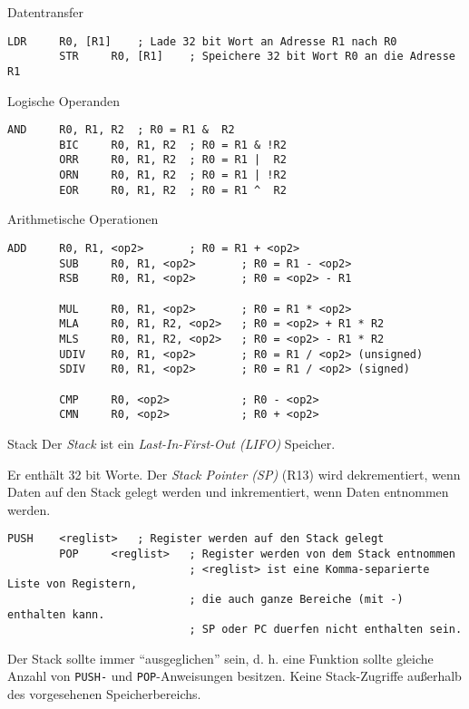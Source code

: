 \begin{defi}{Datentransfer}
    \begin{lstlisting}[language={[x86masm]Assembler}]
        LDR     R0, [R1]    ; Lade 32 bit Wort an Adresse R1 nach R0
        STR     R0, [R1]    ; Speichere 32 bit Wort R0 an die Adresse R1  
    \end{lstlisting}
\end{defi}

\begin{defi}{Logische Operanden}
    \begin{lstlisting}[language={[x86masm]Assembler}]
        AND     R0, R1, R2  ; R0 = R1 &  R2
        BIC     R0, R1, R2  ; R0 = R1 & !R2
        ORR     R0, R1, R2  ; R0 = R1 |  R2
        ORN     R0, R1, R2  ; R0 = R1 | !R2
        EOR     R0, R1, R2  ; R0 = R1 ^  R2
    \end{lstlisting}
\end{defi}

\begin{defi}{Arithmetische Operationen}
    \begin{lstlisting}[language={[x86masm]Assembler}]
        ADD     R0, R1, <op2>       ; R0 = R1 + <op2>
        SUB     R0, R1, <op2>       ; R0 = R1 - <op2>
        RSB     R0, R1, <op2>       ; R0 = <op2> - R1

        MUL     R0, R1, <op2>       ; R0 = R1 * <op2>
        MLA     R0, R1, R2, <op2>   ; R0 = <op2> + R1 * R2
        MLS     R0, R1, R2, <op2>   ; R0 = <op2> - R1 * R2
        UDIV    R0, R1, <op2>       ; R0 = R1 / <op2> (unsigned)
        SDIV    R0, R1, <op2>       ; R0 = R1 / <op2> (signed)

        CMP     R0, <op2>           ; R0 - <op2>
        CMN     R0, <op2>           ; R0 + <op2>
    \end{lstlisting}
\end{defi}

\begin{defi}{Stack}
    Der \emph{Stack} ist ein \emph{Last-In-First-Out (LIFO)} Speicher.

    Er enthält 32 bit Worte.
    Der \emph{Stack Pointer (SP)} (R13) wird dekrementiert, wenn Daten auf den Stack gelegt werden und inkrementiert, wenn Daten entnommen werden.

    \begin{lstlisting}[language={[x86masm]Assembler}]
        PUSH    <reglist>   ; Register werden auf den Stack gelegt
        POP     <reglist>   ; Register werden von dem Stack entnommen
                            ; <reglist> ist eine Komma-separierte Liste von Registern,
                            ; die auch ganze Bereiche (mit -) enthalten kann.
                            ; SP oder PC duerfen nicht enthalten sein.
    \end{lstlisting}

    Der Stack sollte immer \enquote{ausgeglichen} sein, d. h. eine Funktion sollte gleiche Anzahl von \texttt{PUSH-} und \texttt{POP}-Anweisungen besitzen.
    Keine Stack-Zugriffe außerhalb des vorgesehenen Speicherbereichs.
\end{defi}

